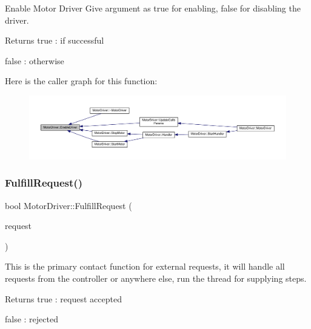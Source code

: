 Enable Motor Driver Give argument as true for enabling, false for disabling the driver. 

\begin{DoxyReturn}{Returns}
true \+: if successful 

false \+: otherwise 
\end{DoxyReturn}
Here is the caller graph for this function\+:
\nopagebreak
\begin{figure}[H]
\begin{center}
\leavevmode
\includegraphics[width=350pt]{classMotorDriver_a754252fe0d18118e074cbdc1fe42da57_icgraph}
\end{center}
\end{figure}
\mbox{\label{classMotorDriver_a47d4e4a6cd3eec255eee3864a45e7e76}} 
\subsubsection{\texorpdfstring{Fulfill\+Request()}{FulfillRequest()}}
{\footnotesize\ttfamily bool Motor\+Driver\+::\+Fulfill\+Request (\begin{DoxyParamCaption}\item[{\hyperlink{structCONFIG__SET_1_1MOTION__REQUEST}{C\+O\+N\+F\+I\+G\+\_\+\+S\+E\+T\+::\+M\+O\+T\+I\+O\+N\+\_\+\+R\+E\+Q\+U\+E\+ST}}]{request }\end{DoxyParamCaption})}



This is the primary contact function for external requests, it will handle all requests from the controller or anywhere else, run the thread for supplying steps. 

\begin{DoxyReturn}{Returns}
true \+: request accepted 

false \+: rejected 
\end{DoxyReturn}
\mbox{\label{classMotorDriver_a409447a5b649f11549d4c6764a304d11}} 
